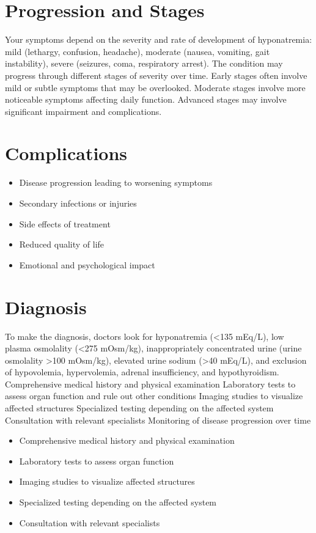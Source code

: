 \section{Progression and Stages}
Your symptoms depend on the severity and rate of development of hyponatremia: mild (lethargy, confusion, headache), moderate (nausea, vomiting, gait instability), severe (seizures, coma, respiratory arrest). The condition may progress through different stages of severity over time. Early stages often involve mild or subtle symptoms that may be overlooked. Moderate stages involve more noticeable symptoms affecting daily function. Advanced stages may involve significant impairment and complications.
\section{Complications}
\begin{itemize}[noitemsep]
  \item Disease progression leading to worsening symptoms
  \item Secondary infections or injuries
  \item Side effects of treatment
  \item Reduced quality of life
  \item Emotional and psychological impact
\end{itemize}
\section{Diagnosis}
To make the diagnosis, doctors look for hyponatremia (<135 mEq/L), low plasma osmolality (<275 mOsm/kg), inappropriately concentrated urine (urine osmolality >100 mOsm/kg), elevated urine sodium (>40 mEq/L), and exclusion of hypovolemia, hypervolemia, adrenal insufficiency, and hypothyroidism. Comprehensive medical history and physical examination Laboratory tests to assess organ function and rule out other conditions Imaging studies to visualize affected structures Specialized testing depending on the affected system Consultation with relevant specialists Monitoring of disease progression over time

\begin{itemize}[noitemsep]
  \item Comprehensive medical history and physical examination
  \item Laboratory tests to assess organ function
  \item Imaging studies to visualize affected structures
  \item Specialized testing depending on the affected system
  \item Consultation with relevant specialists
\end{itemize}
